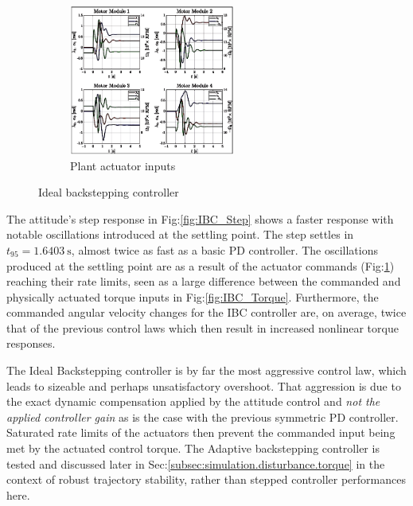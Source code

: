\begin{figure}[htbp]
\begin{subfigure}{\textwidth}
\centering
\includegraphics[width=0.6\textwidth]{graphs/IBC_Input}
\vspace{-8pt}
\caption{Plant actuator inputs}
\label{fig:IBC_Input}
\end{subfigure}
\vspace{-8pt}
\caption{Ideal backstepping controller}
\label{fig:IBC_controller_result}
\vspace{-10pt}
\end{figure}
\par
The attitude's step response in Fig:\ref{fig:IBC_Step} shows a faster response with notable oscillations introduced at the settling point. The step settles in $t_{95}=1.6403~\text{s}$, almost twice as fast as a basic PD controller. The oscillations produced at the settling point are as a result of the actuator commands (Fig:\ref{fig:IBC_Input}) reaching their rate limits, seen as a large difference between the commanded and physically actuated torque inputs in Fig:\ref{fig:IBC_Torque}. Furthermore, the commanded angular velocity changes for the IBC controller are, on average, twice that of the previous control laws which then result in increased nonlinear torque responses.
\par
The Ideal Backstepping controller is by far the most aggressive control law, which leads to sizeable and perhaps unsatisfactory overshoot. That aggression is due to the exact dynamic compensation applied by the attitude control and \emph{not the applied controller gain} as is the case with the previous symmetric PD controller. Saturated rate limits of the actuators then prevent the commanded input being met by the actuated control torque. The Adaptive backstepping controller is tested and discussed later in Sec:\ref{subsec:simulation.disturbance.torque} in the context of robust trajectory stability, rather than stepped controller performances here.
